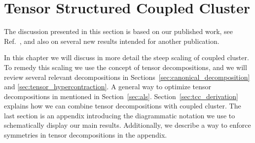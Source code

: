 \chapter{Tensor Structured Coupled Cluster
\label{ch:tcc}} 
The discussion presented in this section is based on our published work, see 
Ref.~\cite{schutski2017tensor}, and also on several new results intended for 
another publication.

In this chapter we will discuss in more detail the steep scaling of coupled 
cluster. To remedy this scaling we use the concept of tensor decompositions, and 
we will review several relevant decompositions 
in Sections~\ref{sec:canonical_decomposition} and 
\ref{sec:tensor_hypercontraction}. A general way to optimize tensor 
decompositions in mentioned in Section~\ref{sec:als}. 
Section~\ref{sec:tcc_derivation} explains how we can combine tensor 
decompositions with coupled cluster. The last section is an 
appendix introducing the diagrammatic notation we use to schematically display 
our main results. Additionally, we describe a way to enforce symmetries in 
tensor decompositions in the appendix. 


